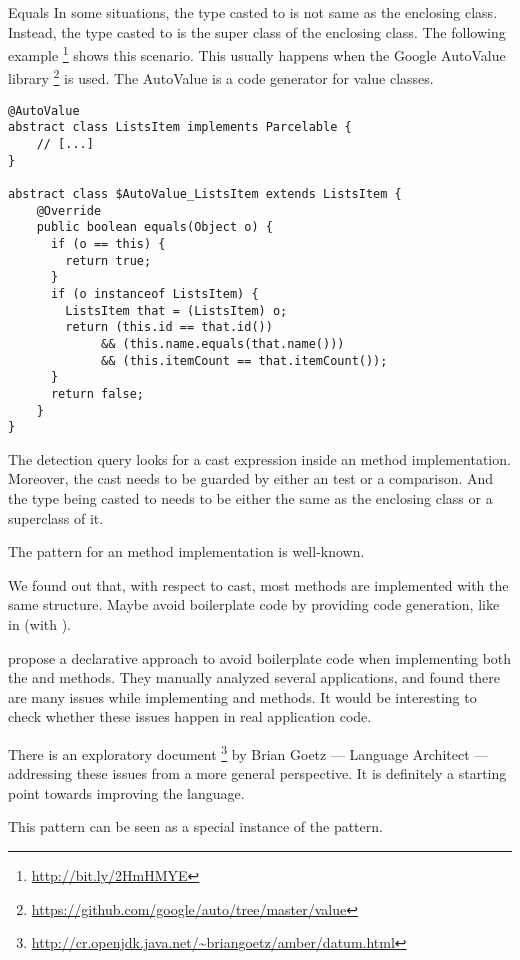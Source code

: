 \begin{pattern}{Equals}
In some situations, the type casted to is not same as the enclosing class.
Instead, the type casted to is the super class of the enclosing class.
The following example%
\footnote{\url{http://bit.ly/2HmHMYE}}
shows this scenario.
This usually happens when the Google AutoValue library%
\footnote{\url{https://github.com/google/auto/tree/master/value}}
is used.
The AutoValue is a code generator for value classes.

\begin{verbatim}
@AutoValue
abstract class ListsItem implements Parcelable {
    // [...]
}

abstract class $AutoValue_ListsItem extends ListsItem {
    @Override
    public boolean equals(Object o) {
      if (o == this) {
        return true;
      }
      if (o instanceof ListsItem) {
        ListsItem that = (ListsItem) o;
        return (this.id == that.id())
             && (this.name.equals(that.name()))
             && (this.itemCount == that.itemCount());
      }
      return false;
    }
}
\end{verbatim}

\detection{}
The detection query looks for a cast expression inside an  method implementation.
Moreover, the cast needs to be guarded by either an  test or a  comparison.
And the type being casted to needs to be either the same as the enclosing class or a superclass of it.

\discussion{}
The pattern for an  method implementation is well-known.

We found out that, with respect to cast,
most  methods are implemented with the same structure.
Maybe avoid boilerplate code by providing code generation,
like in \haskell{} (with ).

\cite{vaziriDeclarativeObjectIdentity2007} propose a declarative approach to avoid boilerplate code when implementing both the  and  methods.
They manually analyzed several applications, and found there are many issues while implementing  and  methods.
It would be interesting to check whether these issues happen in real application code.

There is an exploratory document%
\footnote{\url{http://cr.openjdk.java.net/\~briangoetz/amber/datum.html}}
by Brian Goetz --- \java{} Language Architect --- addressing these issues from a more general perspective.
It is definitely a starting point towards improving the \java{} language.

\related{}
This pattern can be seen as a special instance of the  pattern.
\end{pattern}